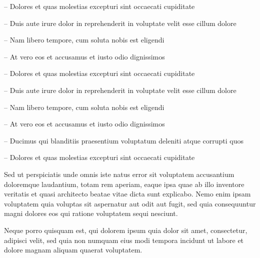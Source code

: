 \documentclass[color=RoyalBlue]{devResume}
\begin{document}
{            
                {
                    \item[--] Dolores et quas molestias excepturi sint occaecati cupiditate
                    \item[--] Duis aute irure dolor in reprehenderit in voluptate velit esse cillum dolore
                    \item[--] Nam libero tempore, cum soluta nobis est eligendi
                }

                {
                    \item[--] At vero eos et accusamus et iusto odio dignissimos
                    \item[--] Dolores et quas molestias excepturi sint occaecati cupiditate
                    \item[--] Duis aute irure dolor in reprehenderit in voluptate velit esse cillum dolore
                    \item[--] Nam libero tempore, cum soluta nobis est eligendi
                }

                {
                    \item[--] At vero eos et accusamus et iusto odio dignissimos
                    \item[--] Ducimus qui blanditiis praesentium voluptatum deleniti atque corrupti quos
                    \item[--] Dolores et quas molestias excepturi sint occaecati cupiditate
                }

            Sed ut perspiciatis unde omnis iste natus error sit voluptatem accusantium doloremque laudantium, totam rem aperiam, eaque ipsa quae ab illo inventore veritatis et quasi architecto beatae vitae dicta sunt explicabo. Nemo enim ipsam voluptatem quia voluptas sit aspernatur aut odit aut fugit, sed quia consequuntur magni dolores eos qui ratione voluptatem sequi nesciunt.

            \smallskip
            Neque porro quisquam est, qui dolorem ipsum quia dolor sit amet, consectetur, adipisci velit, sed quia non numquam eius modi tempora incidunt ut labore et dolore magnam aliquam quaerat voluptatem.

    }
\end{document}
